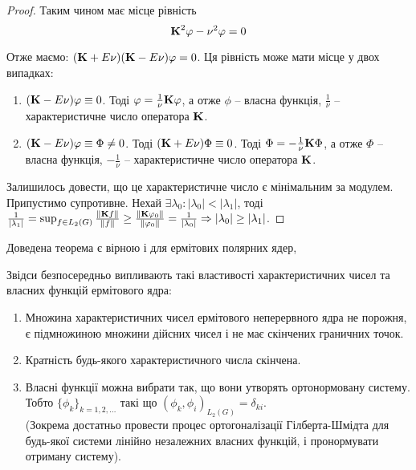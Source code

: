 \begin{proof}
	Таким чином має місце рівність
	\begin{equation}
		\label{eq:3.3}
		\bf{K}^2 \phi - \nu^2 \phi = 0
	\end{equation}
	
	Отже маємо: $(\bf{K} + E\nu)(\bf{K} - E \nu)\phi=0$. Ця рівність може мати місце у двох випадках:
	\begin{enumerate}
		\item $(\bf{K} - E\nu) \phi \equiv 0$. Тоді $\phi = \frac{1}{\nu}\bf{K}\phi$, а отже $\phi$ -- власна функція, $\frac{1}{\nu}$ -- характеристичне число оператора $\bf{K}$.

		\item $(\bf{K} - E\nu) \phi \equiv \Phi \ne 0$. Тоді $(\bf{K} + E \nu) \Phi \equiv 0$. Тоді $\Phi = -\frac{1}{\nu}\bf{K}\Phi$, а отже $\Phi$ -- власна функція, $-\frac{1}{\nu}$ -- характеристичне число оператора $\bf{K}$.
	\end{enumerate}
	
	Залишилось довести, що це характеристичне число є мінімальним за модулем. Припустимо супротивне. Нехай $\exists \lambda_0: |\lambda_0| < |\lambda_1|$, тоді $\frac{1}{|\lambda_1|} = \sup_{f \in L_2(G)} \frac{\|\bf{K}f\|}{\|f\|} \ge \frac{\|\bf{K}\phi_0\|}{\|\phi_0\|} = \frac{1}{|\lambda_0|} \Rightarrow |\lambda_0| \ge |\lambda_1|$.
\end{proof}

\begin{remark*}
	Доведена теорема є вірною і для ермітових полярних ядер,
\end{remark*}

Звідси безпосередньо випливають такі властивості характеристичних чисел та власних функцій ермітового ядра:
\begin{enumerate}
	\item Множина характеристичних чисел ермітового неперервного ядра не порожня, є підмножиною множини дійсних чисел і не має скінчених граничних точок.
	\item Кратність будь-якого характеристичного числа скінчена.
	\item Власні функції можна вибрати так, що вони утворять ортонормовану систему. Тобто $\{ \phi_k\}_{k = 1, 2, \ldots}$ такі що $(\phi_k, \phi_i)_{L_2(G)} = \delta_{ki}$. \\
	
	(Зокрема достатньо провести процес ортогоналізації Гілберта-Шмідта для будь-якої системи лінійно незалежних власних функцій, і пронормувати отриману систему).
\end{enumerate}

